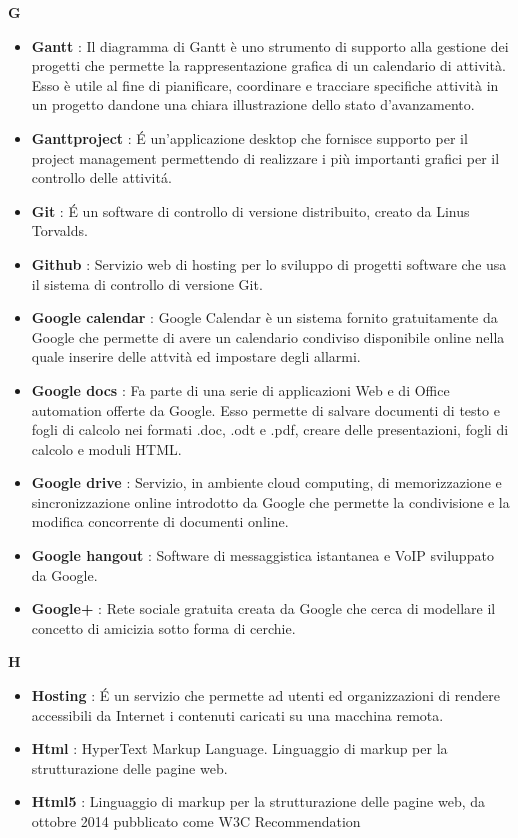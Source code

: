 \newpage
{\huge \textbf{G}}
\begin{flushleft}
\begin{itemize}[label={}]
\item \textbf{Gantt} : Il diagramma di Gantt è uno strumento di supporto alla gestione dei progetti che permette la rappresentazione grafica di un calendario di attività. Esso è utile al fine di pianificare, coordinare e tracciare specifiche attività in un progetto dandone una chiara illustrazione dello stato d'avanzamento.
\item \textbf{Ganttproject} : \'E un'applicazione desktop che fornisce supporto per il project management permettendo di realizzare i più importanti grafici per il controllo delle attivit\'a.
\item \textbf{Git} : \'E un software di controllo di versione distribuito, creato da Linus Torvalds.
\item \textbf{Github} : Servizio web di hosting per lo sviluppo di progetti software che usa il sistema di controllo di versione Git.
\item \textbf{Google calendar} : Google Calendar è un sistema fornito gratuitamente da Google che permette di avere un calendario condiviso disponibile online nella quale inserire delle attvità ed impostare degli allarmi.
\item \textbf{Google docs} : Fa parte di una serie di applicazioni Web e di Office automation offerte da Google. Esso permette di salvare documenti di testo e fogli di calcolo nei formati .doc, .odt e .pdf, creare delle presentazioni, fogli di calcolo e moduli HTML.
\item \textbf{Google drive} : Servizio, in ambiente cloud computing, di memorizzazione e sincronizzazione online introdotto da Google che permette la condivisione e la modifica concorrente di documenti online.
\item \textbf{Google hangout} : Software di messaggistica istantanea e VoIP sviluppato da Google.
\item \textbf{Google+} : Rete sociale gratuita creata da Google che cerca di modellare il concetto di amicizia sotto forma di cerchie.
\end{itemize}
\end{flushleft}
\newpage
{\huge \textbf{H}}
\begin{flushleft}
\begin{itemize}[label={}]
\item \textbf{Hosting} : \'E un servizio che permette ad utenti ed organizzazioni di rendere accessibili da Internet i contenuti caricati su una macchina remota.
\item \textbf{Html} : HyperText Markup Language. Linguaggio di markup per la strutturazione delle pagine web.
\item \textbf{Html5} : Linguaggio di markup per la strutturazione delle pagine web, da ottobre 2014 pubblicato come W3C Recommendation
\end{itemize}
\end{flushleft}
